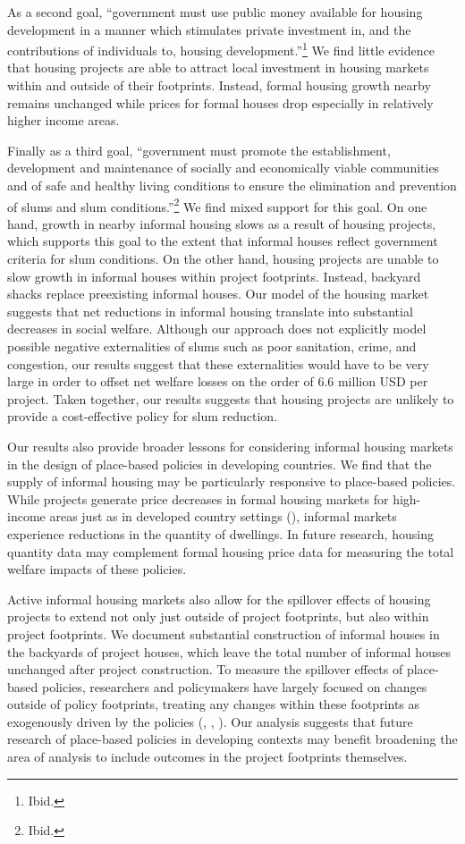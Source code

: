 \documentclass[12pt]{article}
\begin{document}
As a second goal, ``government must use public money available for housing development in a manner which stimulates private investment in, and the contributions of individuals to, housing development.''\footnote{Ibid.}    We find little evidence that housing projects are able to attract local investment in housing markets within and outside of their footprints.  Instead, formal housing growth nearby remains unchanged while prices for formal houses drop especially in relatively higher income areas.

Finally as a third goal, ``government must promote the establishment, development and maintenance of socially and economically viable communities and of safe and healthy living conditions to ensure the elimination and prevention of slums and slum conditions.''\footnote{Ibid.}  We find mixed support for this goal.  On one hand, growth in nearby informal housing slows as a result of housing projects, which supports this goal to the extent that informal houses reflect government criteria for slum conditions.  On the other hand, housing projects are unable to slow growth in informal houses within project footprints.  Instead, backyard shacks replace preexisting informal houses.  Our model of the housing market suggests that net reductions in informal housing translate into substantial decreases in social welfare.  Although our approach does not explicitly model possible negative externalities of slums such as poor sanitation, crime, and congestion, our results suggest that these externalities would have to be very large in order to offset net welfare losses on the order of 6.6 million USD per project.  Taken together, our results suggests that housing projects are unlikely to provide a cost-effective policy for slum reduction.

Our results also provide broader lessons for considering informal housing markets in the design of place-based policies in developing countries.  We find that the supply of informal housing may be particularly responsive to place-based policies.  While projects generate price decreases in formal housing markets for high-income areas just as in developed country settings (\cite{diamond2016wants}), informal markets experience reductions in the quantity of dwellings.  In future research, housing quantity data may complement formal housing price data for measuring the total welfare impacts of these policies.  

Active informal housing markets also allow for the spillover effects of housing projects to extend not only just outside of project footprints, but also within project footprints.  We document substantial construction of informal houses in the backyards of project houses, which leave the total number of informal houses unchanged after project construction.  To measure the spillover effects of place-based policies, researchers and policymakers have largely focused on changes outside of policy footprints, treating any changes within these footprints as exogenously driven by the policies (\cite{diamond2016wants}, \cite{rossi2010housing}, \cite{hornbeck2017creative}).  Our analysis suggests that future research of place-based policies in developing contexts may benefit broadening the area of analysis to include outcomes in the project footprints themselves.
\end{document}
